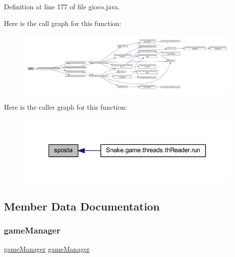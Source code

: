Definition at line 177 of file gioco.\+java.

Here is the call graph for this function\+:
\nopagebreak
\begin{figure}[H]
\begin{center}
\leavevmode
\includegraphics[width=350pt]{class_snake_1_1game_1_1gioco_ad62cb3f928d2518fde54d64970bb850d_cgraph}
\end{center}
\end{figure}
Here is the caller graph for this function\+:
\nopagebreak
\begin{figure}[H]
\begin{center}
\leavevmode
\includegraphics[width=327pt]{class_snake_1_1game_1_1gioco_ad62cb3f928d2518fde54d64970bb850d_icgraph}
\end{center}
\end{figure}


\subsection{Member Data Documentation}
\mbox{\label{class_snake_1_1game_1_1gioco_a719dbe54fbba578b11711a4b21e5b07c}} 
\subsubsection{\texorpdfstring{game\+Manager}{gameManager}}
{\footnotesize\ttfamily \mbox{\hyperlink{class_snake_1_1game_1_1utility_1_1game_manager}{game\+Manager}} \mbox{\hyperlink{class_snake_1_1game_1_1utility_1_1game_manager}{game\+Manager}}\hspace{0.3cm}{\ttfamily [private]}}

